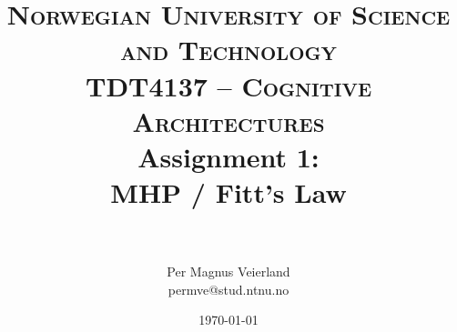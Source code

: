 

\title{
\normalfont \normalsize
\textsc{Norwegian University of Science and Technology\\TDT4137 -- Cognitive Architectures}
\horrule{0.5pt} \\[0.4cm]
\huge Assignment 1:\\ MHP / Fitt's Law\\
\horrule{2pt} \\[0.5cm]
}

\author{Per Magnus Veierland\\permve@stud.ntnu.no}

\date{\normalsize\today}




\maketitle

